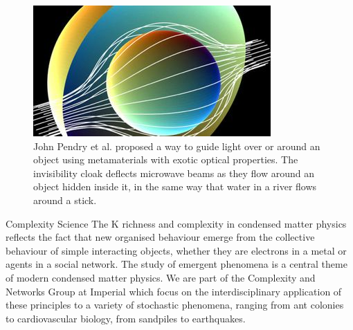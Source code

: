 \documentclass[xcolor={table}]{beamer}
\begin{document}
\begin{frame}[fragile=singleslide,t]
\begin{columns}[onlytextwidth,T]
\begin{column}{.47\textwidth}
\begin{figure}
    \includegraphics[width=\columnwidth, height=0.15\textheight]{metamaterials.jpg}
    \caption{\footnotesize John Pendry et al. proposed a way to guide light over or around an object using metamaterials with exotic optical properties. The invisibility cloak deflects microwave beams as they flow around an object hidden inside it, in the same way that water in a river flows around a stick.}
\end{figure}

\begin{block}{Complexity Science}
The K richness and complexity in condensed matter physics reflects the
fact that new organised behaviour emerge from the collective behaviour of simple
interacting objects, whether they are electrons in a metal or agents in a social
network. The study of emergent phenomena is a central theme of modern condensed
matter physics. We are part of the Complexity and Networks Group at Imperial
which focus on the interdisciplinary application of these principles to a
variety of stochastic phenomena, ranging from ant colonies to cardiovascular
biology, from sandpiles to earthquakes.
\end{block}


\end{column}
\end{columns}
\end{frame}
\end{document}
